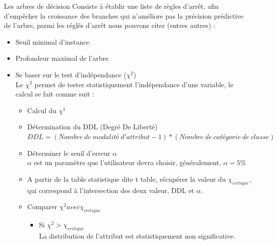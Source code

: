 \documentclass[a4paper, 11pt]{report}
\begin{document}
\begin{chapter}{Les arbres de décision}
Consiste à établir une liste de règles d'arrêt, afin d'empêcher la croissance des branches qui n'améliore pas la précision prédictive de l'arbre\cite{esposito1997comparative}, parmi les réglés d'arrêt nous pouvons citer (entres autres) : 
\begin{itemize}
\item Seuil minimal d'instance
\item Profondeur maximal de l'arbre
\item Se baser sur le test d'indépendance ($\chi^2$)\\
Le $\chi^2$ permet de tester statistiquement l'indépendance d'une variable, le calcul se fait comme suit :\\
\begin{itemize}
\item Calcul du $\chi^1$ 
\item Détermination du DDL (Degré De Liberté)\\
$DDL = (Nombre\ de\ modalité\ d'attribut-1)*(Nombre\ de\ catégorie\ de\ classe)$
\item Déterminer le seuil d'erreur $\alpha$\\
$\alpha$ est un paramètre que l'utilisateur devra choisir, généralement, $\alpha=5\%$
\item A partir de la table statistique dite t table, récupérer la valeur du $\chi_{critique}$, qui correspond à l'intersection des deux valeur, DDL et $\alpha$.
\item Comparer $\chi^2 avec \chi_{critique}$
\begin{itemize}
\item Si $\chi^2 > \chi_{critique}$\\
La distribution de l'attribut est statistiquement non significative.
\end{itemize}

\begin{figure}[h!]
\begin{center}


\end{center}
\end{figure}
\end{itemize}
\end{itemize}
\end{chapter}
\end{document}
